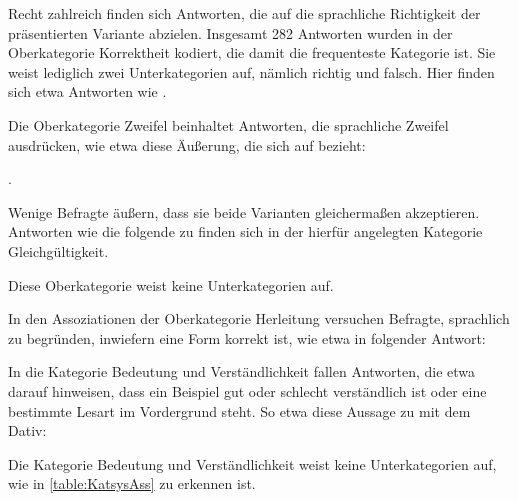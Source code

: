 Recht zahlreich finden sich Antworten, die auf die sprachliche Richtigkeit der präsentierten Variante abzielen. 
Insgesamt 282 Antworten wurden in der Oberkategorie \glqq Korrektheit\grqq{} kodiert, die damit die frequenteste Kategorie ist. 
Sie weist lediglich zwei Unterkategorien auf, nämlich \glqq richtig\grqq{} und \glqq falsch\grqq. 
Hier finden sich etwa Antworten wie . 

Die Oberkategorie \glqq Zweifel\grqq{} beinhaltet Antworten, die sprachliche Zweifel ausdrücken, wie etwa diese Äußerung, die sich auf \gegenueber{} bezieht: 
\begin{exe}
\ex {}. 
\end{exe}
Wenige Befragte äußern, dass sie beide Varianten gleichermaßen akzeptieren. 
Antworten wie die folgende zu \dank{} finden sich in der hierfür angelegten Kategorie \glqq Gleichgültigkeit\grqq.
\begin{exe}
\ex {}
\end{exe}
Diese Oberkategorie weist keine Unterkategorien auf.

\begin{sloppypar}
In den Assoziationen der Oberkategorie \glqq Herleitung\grqq{} versuchen Befragte, sprachlich zu begründen, inwiefern eine Form korrekt ist, wie etwa in folgender Antwort: 
\end{sloppypar}

\begin{exe}
\ex {}
\end{exe}

In die Kategorie \glqq Bedeutung und Verständlichkeit\grqq{} fallen Antworten, die etwa darauf hinweisen, dass ein Beispiel gut oder schlecht verständlich ist oder eine bestimmte Lesart im Vordergrund steht. 
So etwa diese Aussage zu \gegenueber{} mit dem Dativ: 
\begin{exe}
\ex {}
\end{exe}
Die Kategorie \glqq Bedeutung und Verständlichkeit\grqq{} weist keine Unterkategorien auf, wie in \autoref{table:KatsysAss} zu erkennen ist.
 
